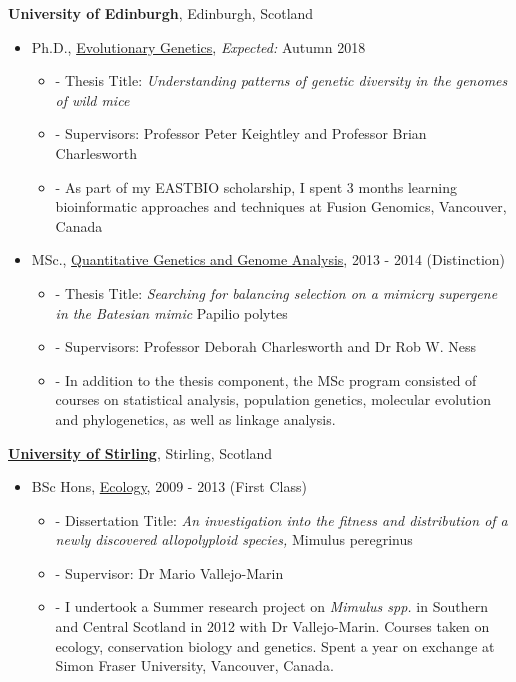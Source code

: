 \documentclass[10pt]{article}
\newenvironment{outerlist}[1][\enskip\textbullet]%
        {\begin{itemize}[#1,leftmargin=*]}{\end{itemize}%
         \vspace{-.6\baselineskip}}
\newenvironment{innerlist}[1][\enskip\textbullet]%
        {\begin{itemize}[#1,leftmargin=*,parsep=0pt,itemsep=0pt,topsep=0pt,partopsep=0pt]}
        {\end{itemize}}
\begin{document}
{\textbf{University of Edinburgh}},
Edinburgh, Scotland
\begin{outerlist}

\item[] Ph.D.,
             \href{http://www.ed.ac.uk/biology/evolutionary-biology} {Evolutionary Genetics},
             \emph{Expected:} Autumn 2018
        \begin{innerlist}
        \item[]- Thesis Title: \emph{Understanding patterns of genetic diversity in the genomes of wild mice}
        \item[]- Supervisors: Professor Peter Keightley and Professor Brian Charlesworth
        \item[]- As part of my EASTBIO scholarship, I spent 3 months learning bioinformatic approaches and techniques at Fusion Genomics, Vancouver, Canada
        \end{innerlist}

\item[] MSc.,
        \href{http://qgen.bio.ed.ac.uk/}
             {Quantitative Genetics and Genome Analysis},
             2013 - 2014 (Distinction)
        \begin{innerlist}
        \item[]- Thesis Title: \emph{Searching for balancing selection on a mimicry supergene in the Batesian mimic} Papilio polytes
        \item[]- Supervisors: Professor Deborah Charlesworth and Dr Rob W. Ness
        \item[]- In addition to the thesis component, the MSc program consisted of courses on statistical analysis, population genetics, molecular evolution and phylogenetics, as well as linkage analysis.
        \end{innerlist}
\end{outerlist}
\vspace{.1in}
\href{}{\textbf{University of Stirling}},
Stirling, Scotland
\begin{outerlist}
\item[] BSc Hons,
        \href{http://www.stir.ac.uk/natural-sciences/about-us/bes/}
             {Ecology}, 2009 - 2013 (First Class)
        \begin{innerlist}
        \item[]- Dissertation Title: \emph{An investigation into the fitness and distribution of a newly discovered allopolyploid species,} Mimulus peregrinus
        \item[]- Supervisor:
                   Dr Mario Vallejo-Marin
        \item[]- I undertook a Summer research project on \emph{Mimulus spp.} in Southern and Central Scotland in 2012 with Dr Vallejo-Marin. Courses taken on ecology, conservation biology and genetics. Spent a year on exchange at Simon Fraser University, Vancouver, Canada.
        \end{innerlist}

\end{outerlist}
\end{document}
